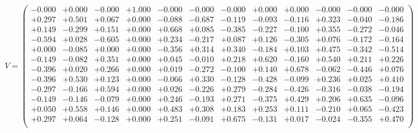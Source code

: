 \documentclass[9pt]{article}
\theoremstyle{plain}
\theoremstyle{definition}
\theoremstyle{remark}
\numberwithin{equation}{section}
\begin{document}
$V = \left(
\begin{array}{
cccccccccccc}
-0.000 & +0.000 & -0.000 & +1.000 & -0.000 & -0.000 & -0.000 & +0.000 & +0.000 & -0.000 & -0.000 & -0.000 \\
+0.297 & +0.501 & +0.067 & +0.000 & -0.088 & -0.687 & -0.119 & -0.093 & -0.116 & +0.323 & -0.040 & -0.186 \\
+0.149 & -0.299 & +0.151 & +0.000 & +0.668 & +0.085 & -0.385 & -0.227 & -0.100 & +0.355 & -0.272 & -0.046 \\
-0.594 & +0.028 & -0.605 & +0.000 & +0.234 & -0.217 & +0.087 & +0.126 & -0.305 & +0.076 & -0.172 & -0.164 \\
+0.000 & -0.085 & +0.000 & +0.000 & -0.356 & +0.314 & +0.340 & -0.184 & +0.103 & +0.475 & -0.342 & -0.514 \\
-0.149 & -0.082 & +0.351 & +0.000 & +0.045 & -0.010 & +0.218 & +0.620 & -0.160 & +0.540 & +0.211 & +0.226 \\
-0.396 & +0.020 & +0.266 & +0.000 & +0.019 & -0.272 & -0.100 & +0.140 & +0.678 & -0.062 & -0.446 & +0.076 \\
-0.396 & +0.530 & +0.123 & +0.000 & -0.066 & +0.330 & -0.128 & -0.428 & -0.099 & +0.236 & +0.025 & +0.410 \\
-0.297 & -0.166 & +0.594 & +0.000 & +0.026 & -0.226 & +0.279 & -0.284 & -0.426 & -0.316 & -0.038 & -0.194 \\
-0.149 & -0.146 & -0.079 & +0.000 & +0.246 & -0.193 & +0.271 & -0.375 & +0.429 & +0.206 & +0.635 & -0.096 \\
+0.050 & +0.558 & +0.146 & +0.000 & +0.483 & +0.308 & +0.183 & +0.253 & +0.111 & -0.210 & +0.065 & -0.423 \\
+0.297 & +0.064 & -0.128 & +0.000 & +0.251 & -0.091 & +0.675 & -0.131 & +0.017 & -0.024 & -0.355 & +0.470 \\
\end{array}
\right)$ \newline 
\end{document}
